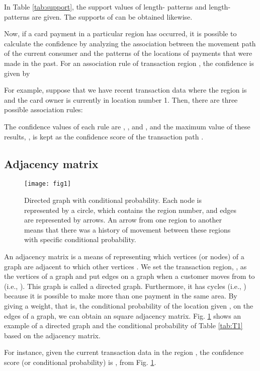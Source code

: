 \documentclass[final,authoryear,5p,times,twocolumn]{elsarticle}
\begin{document}
In Table \ref{tab:support}, the support values of length- patterns  and length- patterns  are given. The supports of  can be obtained likewise.

Now, if a card payment in a particular region has occurred, it is possible to calculate the confidence by analyzing the association between the movement path of the current consumer and the patterns of the locations of payments that were made in the past. For an association rule of transaction region , the confidence is given by


For example, suppose that we have recent transaction data where the region is  and the card owner is currently in location number 1. Then, there are three possible association rules: 

The confidence values of each rule are , , and , and the maximum value of these results, , is kept as the confidence score of the transaction path .



\subsection{Adjacency matrix}
\label{section:Sec3.5}

\begin{figure}[b!]
\texttt{[image: fig1]}
\caption{Directed graph with conditional probability. Each node is represented by a circle, which contains the region number, and edges are represented by arrows. An arrow from one region to another means that there was a history of movement between these regions with specific conditional probability.}
\label{fig:F1}
\end{figure}

An adjacency matrix is a means of representing which vertices (or nodes) of a graph are adjacent to which other vertices \citep{wiki:AD}.
We set the transaction region,  , as the vertices of a graph and put edges on a graph when a customer moves from  to  (i.e., ). This graph is called a directed graph. Furthermore, it has cycles (i.e., ) because it is possible to make more than one payment in the same area. By giving a weight, that is, the conditional probability of the location  given , on the edges of a graph, we can obtain an  square adjacency matrix. Fig. \ref{fig:F1} shows an example of a directed graph and the conditional probability of Table \ref{tab:T1} based on the adjacency matrix.

For instance, given the current transaction data in the region , the confidence score (or conditional probability) is , from Fig. \ref{fig:F1}.
\end{document}
